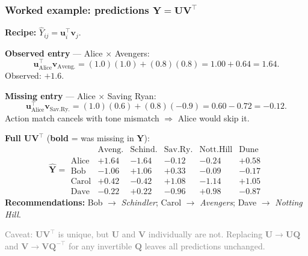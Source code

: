 \documentclass[notes,11pt, aspectratio=169]{beamer}
\newcommand{\vu}{\mathbf{u}}
\newcommand{\vv}{\mathbf{v}}
\newcommand{\vU}{\mathbf{U}}
\newcommand{\vV}{\mathbf{V}}
\newcommand{\vY}{\mathbf{Y}}
\begin{document}
\begin{frame}
\frametitle{Worked example: predictions $\hat{\vY} = \vU \vV^\top$}

\textbf{Recipe:} $\hat Y_{ij} = \vu_i^\top \vv_j$.

\vspace{4pt}
\textbf{Observed entry} --- Alice $\times$ Avengers:
\[
    \vu_{\text{Alice}}^\top \vv_{\text{Aveng.}}
    = (1.0)(1.0) + (0.8)(0.8) = 1.00 + 0.64 = 1.64.
\]
Observed: $+1.6$. \checkmark

\vspace{4pt}
\textbf{Missing entry} --- Alice $\times$ Saving Ryan:
\[
    \vu_{\text{Alice}}^\top \vv_{\text{Sav.Ry.}}
    = (1.0)(0.6) + (0.8)(-0.9) = 0.60 - 0.72 = -0.12.
\]
Action match cancels with tone mismatch $\Rightarrow$ Alice would skip it.

\vspace{4pt}
\textbf{Full $\vU\vV^\top$} (\textbf{bold} = was missing in $\vY$):
{\small
\[
\hat{\vY} = \begin{array}{r|ccccc}
        & \text{Aveng.} & \text{Schind.} & \text{Sav.Ry.} & \text{Nott.Hill} & \text{Dune} \\\hline
\text{Alice} & +1.64 & -1.64 & \mathbf{-0.12} & \mathbf{-0.24} & +0.58 \\
\text{Bob}   & -1.06 & \mathbf{+1.06} & +0.33 & -0.09 & \mathbf{-0.17} \\
\text{Carol} & \mathbf{+0.42} & -0.42 & +1.08 & \mathbf{-1.14} & +1.05 \\
\text{Dave}  & -0.22 & \mathbf{+0.22} & \mathbf{-0.96} & +0.98 & -0.87
\end{array}
\]
}
\textbf{Recommendations:} Bob $\to$ \emph{Schindler}; Carol $\to$ \emph{Avengers}; Dave $\to$ \emph{Notting Hill}.

\vspace{2pt}
{\footnotesize \textcolor{gray}{Caveat: $\vU\vV^\top$ is unique, but $\vU$ and $\vV$ individually are not. Replacing $\vU \to \vU\mathbf{Q}$ and $\vV \to \vV\mathbf{Q}^{-\top}$ for any invertible $\mathbf{Q}$ leaves all predictions unchanged.}}
\end{frame}
\end{document}
